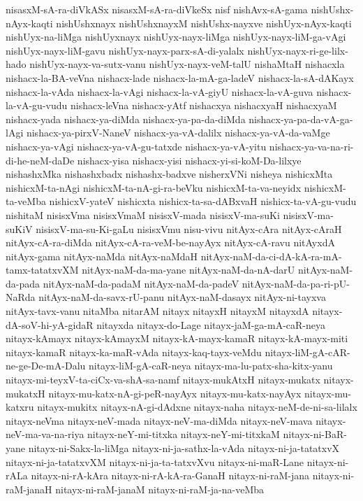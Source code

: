 {nisasxM-sA-ra-diVkASx
nisasxM-sA-ra-diVkeSx
nisf
nishAvx-sA-gama
nishUshx-nAyx-kaqti
nishUshxnayx
nishUshxnayxM
nishUshx-nayxve
nishUyx-nAyx-kaqti
nishUyx-na-liMga
nishUyxnayx
nishUyx-nayx-liMga
nishUyx-nayx-liM-ga-vAgi
nishUyx-nayx-liM-gavu
nishUyx-nayx-parx-sA-di-yalalx
nishUyx-nayx-ri-ge-lilx-hado
nishUyx-nayx-va-sutx-vanu
nishUyx-nayx-veM-talU
nishaMtaH
nishacxla
nishacx-la-BA-veVna
nishacx-lade
nishacx-la-mA-ga-ladeV
nishacx-la-sA-dAKayx
nishacx-la-vAda
nishacx-la-vAgi
nishacx-la-vA-giyU
nishacx-la-vA-guva
nishacx-la-vA-gu-vudu
nishacx-leVna
nishacx-yAtf
nishacxya
nishacxyaH
nishacxyaM
nishacx-yada
nishacx-ya-diMda
nishacx-ya-pa-da-diMda
nishacx-ya-pa-da-vA-ga-lAgi
nishacx-ya-pirxV-NaneV
nishacx-ya-vA-dalilx
nishacx-ya-vA-da-vaMge
nishacx-ya-vAgi
nishacx-ya-vA-gu-tatxde
nishacx-ya-vA-yitu
nishacx-ya-va-na-ri-di-he-neM-daDe
nishacx-yisa
nishacx-yisi
nishacx-yi-si-koM-Da-lilxye
nishashxMka
nishashxbadx
nishashx-badxve
nisherxVNi
nisheya
nishicxMta
nishicxM-ta-nAgi
nishicxM-ta-nA-gi-ra-beVku
nishicxM-ta-va-neyidx
nishicxM-ta-veMba
nishicxV-yateV
nishicxta
nishicx-ta-sa-dABxvaH
nishicx-ta-vA-gu-vudu
nishitaM
nisisxVma
nisisxVmaM
nisisxV-mada
nisisxV-ma-suKi
nisisxV-ma-suKiV
nisisxV-ma-su-Ki-gaLu
nisisxVmu
nisu-vivu
nitAyx-cAra
nitAyx-cAraH
nitAyx-cA-ra-diMda
nitAyx-cA-ra-veM-be-nayAyx
nitAyx-cA-ravu
nitAyxdA
nitAyx-gama
nitAyx-naMda
nitAyx-naMdaH
nitAyx-naM-da-ci-dA-kA-ra-mA-tamx-tatatxvXM
nitAyx-naM-da-ma-yane
nitAyx-naM-da-nA-darU
nitAyx-naM-da-pada
nitAyx-naM-da-padaM
nitAyx-naM-da-padeV
nitAyx-naM-da-pa-ri-pU-NaRda
nitAyx-naM-da-savx-rU-panu
nitAyx-naM-dasayx
nitAyx-ni-tayxva
nitAyx-tavx-vanu
nitaMba
nitarAM
nitayx
nitayxH
nitayxM
nitayxdA
nitayx-dA-soV-hi-yA-gidaR
nitayxda
nitayx-do-Lage
nitayx-jaM-ga-mA-caR-neya
nitayx-kAmayx
nitayx-kAmayxM
nitayx-kA-mayx-kamaR
nitayx-kA-mayx-miti
nitayx-kamaR
nitayx-ka-maR-vAda
nitayx-kaq-tayx-veMdu
nitayx-liM-gA-cAR-ne-ge-De-mA-Dalu
nitayx-liM-gA-caR-neya
nitayx-ma-lu-patx-sha-kitx-yanu
nitayx-mi-teyxV-ta-ciCx-va-shA-sa-namf
nitayx-mukAtxH
nitayx-mukatx
nitayx-mukatxH
nitayx-mu-katx-nA-gi-peR-nayAyx
nitayx-mu-katx-nayAyx
nitayx-mu-katxru
nitayx-mukitx
nitayx-nA-gi-dAdxne
nitayx-naha
nitayx-neM-de-ni-sa-lilalx
nitayx-neVma
nitayx-neV-mada
nitayx-neV-ma-diMda
nitayx-neV-mava
nitayx-neV-ma-va-na-riya
nitayx-neY-mi-titxka
nitayx-neY-mi-titxkaM
nitayx-ni-BaR-yane
nitayx-ni-Sakx-la-liMga
nitayx-ni-ja-sathx-la-vAda
nitayx-ni-ja-tatatxvX
nitayx-ni-ja-tatatxvXM
nitayx-ni-ja-ta-tatxvXvu
nitayx-ni-maR-Lane
nitayx-ni-rALa
nitayx-ni-rA-kAra
nitayx-ni-rA-kA-ra-GanaH
nitayx-ni-raM-jana
nitayx-ni-raM-janaH
nitayx-ni-raM-janaM
nitayx-ni-raM-ja-na-veMba
}
